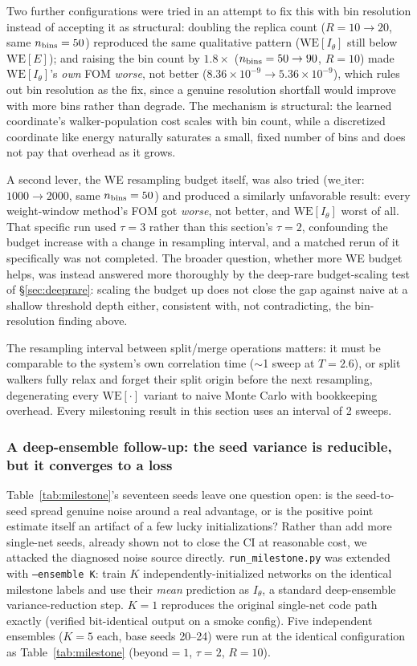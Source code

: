 \documentclass[a4paper,fleqn]{cas-sc}
\begin{document}
Two further configurations were tried in an attempt to fix this with bin resolution instead
of accepting it as structural: doubling the replica count ($R=10\to20$, same $n_{\rm
	bins}=50$) reproduced the same qualitative pattern ($\mathrm{WE}[I_\theta]$ still below
$\mathrm{WE}[E]$); and raising the bin count by $1.8\times$ ($n_{\rm bins}=50\to90$, $R=10$)
made $\mathrm{WE}[I_\theta]$'s \emph{own} FOM \emph{worse}, not better
($8.36\times10^{-9}\to5.36\times10^{-9}$), which rules out bin resolution as the fix, since
a genuine resolution shortfall would improve with more bins rather than degrade. The
mechanism is structural: the learned coordinate's walker-population cost scales with bin
count, while a discretized coordinate like energy naturally saturates a small, fixed
number of bins and does not pay that overhead as it grows.

A second lever, the WE resampling budget itself, was also tried
($\mathrm{we\_iter}$: $1000\to2000$, same $n_{\rm bins}=50$) and produced a similarly
unfavorable result: every weight-window method's FOM got \emph{worse}, not better, and
$\mathrm{WE}[I_\theta]$ worst of all. That specific run used $\tau=3$ rather than this
section's $\tau=2$, confounding the budget increase with a change in resampling interval,
and a matched rerun of it specifically was not completed. The broader question, whether
more WE budget helps, was instead answered more thoroughly by the deep-rare
budget-scaling test of \S\ref{sec:deeprare}: scaling the budget up does not close the gap
against naive at a shallow threshold depth either, consistent with, not contradicting,
the bin-resolution finding above.

The resampling interval between split/merge operations matters: it must be comparable to
the system's own correlation time ($\sim$1 sweep at $T=2.6$), or split walkers fully relax
and forget their split origin before the next resampling, degenerating every
$\mathrm{WE}[\cdot]$ variant to naive Monte Carlo with bookkeeping overhead. Every
milestoning result in this section uses an interval of 2 sweeps.

\subsubsection{A deep-ensemble follow-up: the seed variance is reducible, but it converges
	to a loss}
\label{sec:ensemble}
Table~\ref{tab:milestone}'s seventeen seeds leave one question open: is the
seed-to-seed spread genuine noise around a real advantage, or is the positive point
estimate itself an artifact of a few lucky initializations? Rather than add more single-net
seeds, already shown not to close the CI at reasonable cost, we attacked the diagnosed
noise source directly. \texttt{run\_milestone.py} was extended with \texttt{--ensemble
	K}: train $K$ independently-initialized networks on the identical milestone labels and
use their \emph{mean} prediction as $I_\theta$, a standard deep-ensemble variance-reduction
step. $K=1$ reproduces the original single-net code path exactly (verified bit-identical
output on a smoke config). Five independent ensembles ($K=5$ each, base seeds 20--24) were
run at the identical configuration as Table~\ref{tab:milestone} (beyond$=1$, $\tau=2$, $R=10$).
\end{document}
